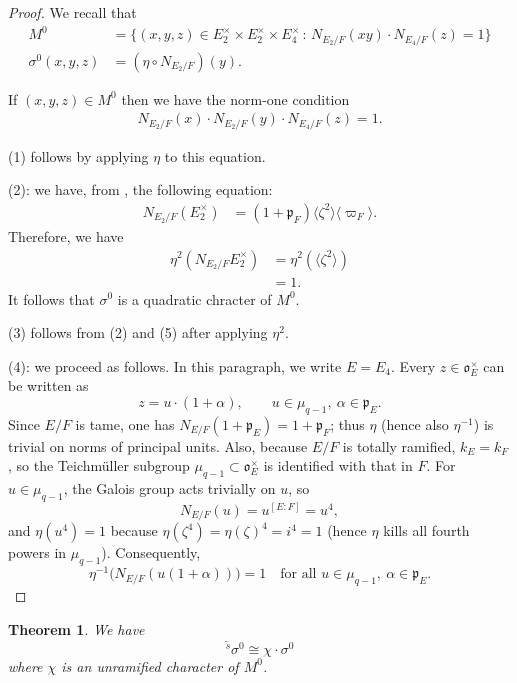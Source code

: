 \documentclass[11pt]{amsart}
\newtheorem{theorem}{Theorem}[section]
\theoremstyle{remark}
\theoremstyle{definition}
\def\fo{\mathfrak{o}}
\def\fp{\mathfrak{p}}
\begin{document}
\begin{proof}    We recall that 
\begin{align*}
M^0 &= \{(x,y,z) \in E_2^\times \times  E_2^\times \times E_4^\times \,:\,  N_{E_2/F}(xy) \cdot N_{E_4/F}(z) = 1\}\\
\sigma^0(x,y,z) & =( \eta \circ N_{E_2/F})(y).
\end{align*}

If $(x,y,z) \in M^0$ then we have the norm-one condition
\begin{align}\label{NE2}
N_{E_2/F}(x) \cdot N_{E_2/F}(y) \cdot  N_{E_4/F}(z) = 1.
\end{align}

(1) follows by applying $\eta$ to this equation.   

(2): we have, from \cite[\S4.1]{R}, the following equation:
\begin{align*}
N_{E_2/F} (E_2^\times) &= (1 + \fp_F) \langle \zeta^2 \rangle \langle \varpi_F \rangle. 
\end{align*}
Therefore, we have
\begin{align*}
 \eta^2 (N_{E_2/F} E_2^\times) &= \eta^2(\langle \zeta^2 \rangle ) \\
& = 1.
\end{align*}
It follows that $\sigma^0$ is a quadratic chracter of $M^0$.     

(3) follows from (2) and (5) after applying $\eta^2$.   

(4): we proceed as follows.     In this paragraph, we write $E = E_4$.   Every $z\in \fo^\times_{E}$ can be written as
\[
z = u\cdot (1+\alpha),
\qquad   u\in\mu_{q-1},\ \alpha\in\mathfrak p_E.
\]
Since $E/F$ is tame, one has $N_{E/F}(1+\mathfrak p_E)=1+\mathfrak p_F$; thus $\eta$ (hence also $\eta^{-1}$) is trivial on norms of principal units.
Also, because $E/F$ is totally ramified, $k_{E} =k_F$, so the Teichm\"uller subgroup $\mu_{q-1}\subset \fo_E^\times$ is identified with that in $F$.
For $u\in\mu_{q-1}$, the Galois group acts trivially on $u$, so
\[
N_{E/F}(u)=u^{[E:F]}=u^4,
\]
and $\eta(u^4)=1$ because $\eta(\zeta^4)=\eta(\zeta)^4=i^4=1$ (hence $\eta$ kills all fourth powers in $\mu_{q-1}$).
Consequently,
\[
\eta^{-1}\!\bigl(N_{E/F}(u(1+\alpha))\bigr)=1
\quad\text{for all }u\in\mu_{q-1},\ \alpha\in\mathfrak p_E.
\]
\end{proof}

\begin{theorem}\label{ETAS}  We have
\[
{}^{\widetilde{s}} \sigma^0 \cong \chi \cdot \sigma^0
\]
where $\chi$ is an unramified character of $M^0$.   
\end{theorem}
\end{document}
